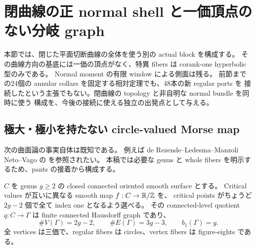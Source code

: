 \section{閉曲線の正 normal shell と一価頂点のない分岐 graph}
\label{ncb:section}

本節では、閉じた平面切断曲線の全体を使う別の actual block を構成する。
その曲線方向の基底には一価の頂点がなく、特異 fibers は corank-one hyperbolic 型のみである。
Normal moment の有限 window による側面は残る。
前節までの24個の annular collars を固定する相対定理でも、48本の新 regular ports を
接続したという主張でもない。閉曲線の topology と非自明な normal bundle を同時に使う
構成を、今後の接続に使える独立の出発点として与える。

\subsection{極大・極小を持たない circle-valued Morse map}

次の曲面論の事実自体は既知である。
例えば de Rezende--Ledesma--Manzoli Neto--Vago の
\cite[Theorem 5.5, Lemma 5.7]{circle-morse-ncb}を参照されたい。
本稿では必要な genus と whole fibers を明示するため、pants の接着から構成する。

\begin{lemma}\label{ncb:circle-morse}
$C$ を genus $g\ge2$ の closed connected oriented smooth surface とする。
Critical values が互いに異なる smooth map $f:C\to\mathbb R/\mathbb Z$ を、
critical points がちょうど $2g-2$ 個で全て index one となるよう選べる。
その connected-level quotient $q:C\to\Gamma$ は finite connected Hausdorff graph であり、
\begin{equation}\label{ncb:graph-counts}
 \#V(\Gamma)=2g-2,\qquad
 \#E(\Gamma)=3g-3,\qquad b_1(\Gamma)=g.
\end{equation}
全 vertices は三価で、regular fibers は circles、vertex fibers は figure-eights である。
\end{lemma}

